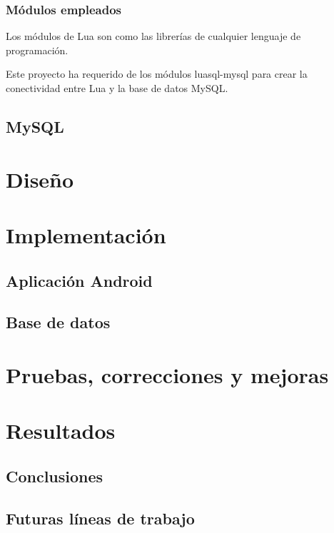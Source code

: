         \subsection{Módulos empleados}

            Los módulos de Lua son como las librerías de cualquier lenguaje de programación.

            Este proyecto ha requerido de los módulos luasql-mysql para crear la conectividad entre Lua y la base de datos MySQL.


    \section{MySQL}


\cleardoublepage



\chapter{Diseño}

\cleardoublepage



\chapter{Implementación}

    \section{Aplicación Android}


    \section{Base de datos}


\cleardoublepage



\chapter{Pruebas, correcciones y mejoras}

\cleardoublepage



\chapter{Resultados}

    \section{Conclusiones}


    \section{Futuras líneas de trabajo}


\cleardoublepage
